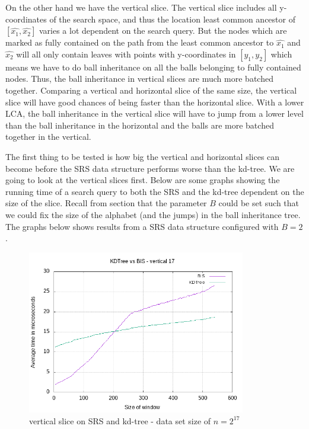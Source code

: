 On the other hand we have the vertical slice. The vertical slice includes all y-coordinates of the search space, and thus the location least common ancestor of $[\hat{x_1}, \hat{x_2}]$ varies a lot dependent on the search query. But the nodes which are marked as fully contained on the path from the least common ancestor to $\hat{x_1}$ and $\hat{x_2}$ will all only contain leaves with points with y-coordinates in $[y_1, y_2]$ which means we have to do ball inheritance on all the balls belonging to fully contained nodes. Thus, the ball inheritance in vertical slices are much more batched together. Comparing a vertical and horizontal slice of the same size, the vertical slice will have good chances of being faster than the horizontal slice. With a lower LCA, the ball inheritance in the vertical slice will have to jump from a lower level than the ball inheritance in the horizontal and the balls are more batched together in the vertical. 

The first thing to be tested is how big the vertical and horizontal slices can become before the SRS data structure performs worse than the kd-tree. We are going to look at the vertical slices first. Below are some graphs showing the running time of a search query to both the SRS and the kd-tree dependent on the size of the slice. Recall from section  that the parameter $B$ could be set such that we could fix the size of the alphabet (and the jumps) in the ball inheritance tree. The graphs below shows results from a SRS data structure configured with $B=2$. 


\begin{figure}[h]
    \centering
    \includegraphics[width = 0.85\textwidth]{pictures/analysis/vert_17.png}
    \caption{vertical slice on SRS and kd-tree - data set size of $n=2^{17}$}\label{fig:vert_17}
\end{figure}

